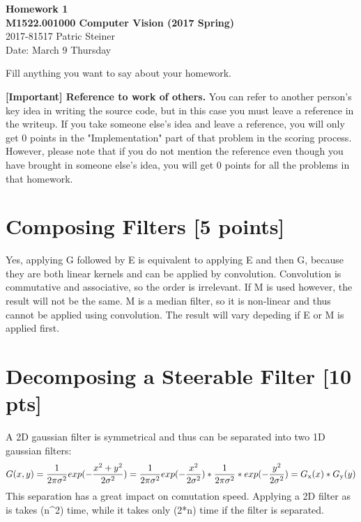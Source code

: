 \documentclass[12pt,a4paper]{article}
\begin{document}
\begin{center}
    {\bf\large Homework 1} \\
    {\bf\large M1522.001000 Computer Vision (2017 Spring)} \\
    2017-81517 Patric Steiner \\
    Date: March 9 Thursday
\end{center}

Fill anything you want to say about your homework.

\textbf{[Important] Reference to work of others.} You can refer to another person's key idea in writing the source code, but in this case you must leave a reference in the writeup. If you take someone else's idea and leave a reference, you will only get 0 points in the "Implementation" part of that problem in the scoring process. 
However, please note that if you do not mention the reference even though you have brought in someone else's idea, you will get 0 points for all the problems in that homework.





\section{Composing Filters [5 points]}

Yes, applying G followed by E is equivalent to applying E and then G, because they are both linear kernels and can be applied by convolution. Convolution is commutative and associative, so the order is irrelevant.
If M is used however, the result will not be the same. M is a median filter, so it is non-linear and thus cannot be applied using convolution. The result will vary depeding if E or M is applied first.

\section{Decomposing a Steerable Filter [10 pts]}

A 2D gaussian filter is symmetrical and thus can be separated into two 1D gaussian filters:
\begin{equation}
    G(x,y) = \frac{1}{2\pi\sigma^2} exp(-\frac{x^2+y^2}{2\sigma^2})
    = \frac{1}{2\pi\sigma^2} exp(-\frac{x^2}{2\sigma^2}) * \frac{1}{2\pi\sigma^2} * exp(-\frac{y^2}{2\sigma^2})
    = G\textsubscript{x}(x) * G\textsubscript{y}(y)
\end{equation}
This separation has a great impact on comutation speed. Applying a 2D filter as is takes (n^2) time, while it takes only (2*n) time if the filter is separated.
\end{document}
